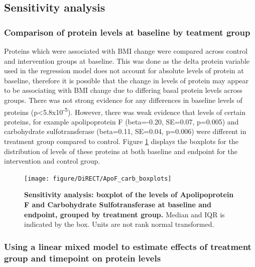 \documentclass[11pt,twoside]{bristolthesis}
\begin{document}
\hypertarget{sensitivity-analysis}{%
\subsection{Sensitivity analysis}\label{sensitivity-analysis}}

\hypertarget{comparison-of-protein-levels-at-baseline-by-teatment-group}{%
\subsubsection{Comparison of protein levels at baseline by teatment group}\label{comparison-of-protein-levels-at-baseline-by-teatment-group}}

Proteins which were associated with BMI change were compared across control and intervention groups at baseline. This was done as the delta protein variable used in the regression model does not account for absolute levels of protein at baseline, therefore it is possible that the change in levels of protein may appear to be associating with BMI change due to differing basal protein levels across groups. There was not strong evidence for any differences in baseline levels of proteins (p\textless5.8x10\textsuperscript{-5}). However, there was weak evidence that levels of certain proteins, for example apolipoprotein F (beta=-0.20, SE=0.07, p=0.005) and carbohydrate sulfotransferase (beta=0.11, SE=0.04, p=0.006) were different in treatment group compared to control. Figure \ref{fig:ApoF-carb-boxplot} displays the boxplots for the distribution of levels of these proteins at both baseline and endpoint for the intervention and control group.



\begin{figure}
\texttt{[image: figure/DiRECT/ApoF\_carb\_boxplots]} \caption[Sensitivity analysis: boxplot of the levels of Apolipoprotein F and Carbohydrate Sulfotransferase at baseline and endpoint, grouped by treatment group.]{\textbf{Sensitivity analysis: boxplot of the levels of Apolipoprotein F and Carbohydrate Sulfotransferase at baseline and endpoint, grouped by treatment group.} Median and IQR is indicated by the box. Units are not rank normal transformed.}\label{fig:ApoF-carb-boxplot}
\end{figure}
\hypertarget{using-a-linear-mixed-model-to-estimate-effects-of-treatment-group-and-timepoint-on-protein-levels}{%
\subsubsection{Using a linear mixed model to estimate effects of treatment group and timepoint on protein levels}\label{using-a-linear-mixed-model-to-estimate-effects-of-treatment-group-and-timepoint-on-protein-levels}}
\end{document}
